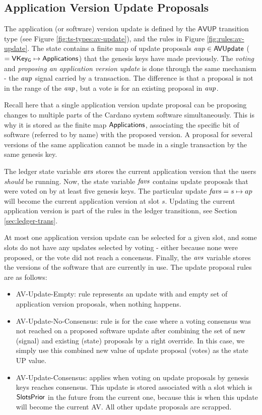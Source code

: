 \subsection{Application Version Update Proposals}
\label{sec:app-proposals}

The application (or software) version update is defined by the $\mathsf{AVUP}$
transition type (see Figure \ref{fig:ts-types:av-update}), and the rules in
Figure \ref{fig:rules:av-update}.
The state contains a finite map of update proposals
$\mathit{aup} \in \mathsf{AVUpdate}$ ($= \mathsf{VKey_G} \mapsto \mathsf{Applications}$) that the genesis keys have
made previously.
The \textit{voting} and \textit{proposing an application version update} is done through the same
mechanism - the $\mathit{aup}$ signal carried by a transaction. The difference
is that a proposal is not in the
range of the $\mathit{aup}$, but a vote is for an existing proposal
in $\mathit{aup}$.

Recall here that a single application version update proposal can be
proposing changes to multiple parts of the Cardano system software simultaneously.
This is why it is stored as the finite map $\mathsf{Applications}$, associating the
specific bit of software (referred to by name) with the proposed version.
A proposal for several versions of the same application cannot be made in
a single transaction by the same genesis key.

The ledger state variable $\mathit{avs}$ stores the current application version
that the users \textit{should} be running.
Now, the state variable $\mathit{favs}$ contains update proposals that
were voted on by at least five genesis keys.
The particular update $\mathit{favs} = s \mapsto ap$ will become
the current application version at slot $s$.
Updating the current application version is part of the rules in the ledger transitionn,
see Section \ref{sec:ledger-trans}.

At most one application version update
can be selected for a given slot, and some slots do not have any
updates selected by voting - either because none were proposed, or the vote
did not reach a concensus. Finally, the $\mathit{avs}$ variable stores
the versions of the software that are currently in use. The update
proposal rules are as follows:

\begin{itemize}
  \item AV-Update-Empty: rule represents an update with
and empty set of application version proposals, when nothing happens.
  \item AV-Update-No-Consensus: rule
is for the case where a voting consensus was not reached on a proposed software
update after combining the set of new (signal) and existing (state) proposals
by a right override. In this case, we simply use this combined new value
of update proposal (votes) as the state UP value.
  \item AV-Update-Consensus: applies when voting on update proposals by genesis keys
reaches consensus. This update is stored associated with a slot which is
$\mathsf{SlotsPrior}$ in the future from the current one, because this is when
this update will become the current AV.
All other update proposals are scrapped.
\end{itemize}

